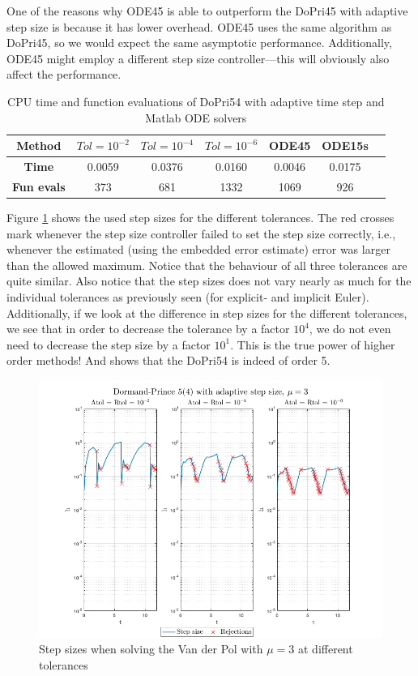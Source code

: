 One of the reasons why ODE45 is able to outperform the DoPri45 with adaptive step size is because it has lower overhead. ODE45 uses the same algorithm as DoPri45, so we would expect the same asymptotic performance. Additionally, ODE45 might employ a different step size controller---this will obviously also affect the performance. 

\begin{table}[H]
    \centering
    \caption{CPU time and function evaluations of DoPri54 with adaptive time step and Matlab ODE solvers}
    \begin{tabular}{|c||c|c|c|c|c|c|} \hline
         \textbf{Method}    & $Tol = 10^{-2}$&   $Tol = 10^{-4}$ & $Tol = 10^{-6}$ & ODE45 & ODE15s     \\ \hline \hline 
         \textbf{Time}      & 0.0059  &  0.0376  &  0.0160 & 0.0046 & 0.0175   \\ \hline
         \textbf{Fun evals} & 373     &    681   &     1332 & 1069 & 926  \\ \hline
    \end{tabular}
    \label{tab6:mu3_adap}
\end{table}

Figure \ref{fig6:adap_mu3_h} shows the used step sizes for the different tolerances. The red crosses mark whenever the step size controller failed to set the step size correctly, i.e., whenever the estimated (using the embedded error estimate) error was larger than the allowed maximum. Notice that the behaviour of all three tolerances are quite similar. Also notice that the step sizes does not vary nearly as much for the individual tolerances as previously seen (for explicit- and implicit Euler). Additionally, if we look at the difference in step sizes for the different tolerances, we see that in order to decrease the tolerance by a factor $10^4$, we do not even need to decrease the step size by a factor $10^1$. This is the true power of higher order methods! And shows that the DoPri54 is indeed of order 5. 

\begin{figure}[H]
    \centering
    \includegraphics[width=\textwidth]{graphics/opg6/mu3_h.png}
    \caption{Step sizes when solving the Van der Pol with $\mu = 3$ at different tolerances}
    \label{fig6:adap_mu3_h}
\end{figure}

